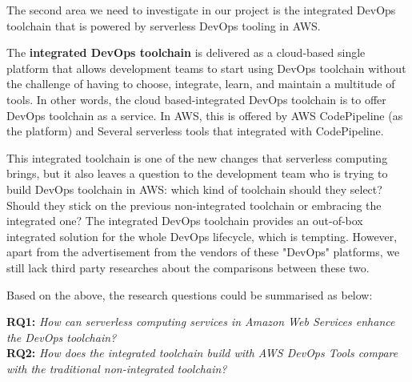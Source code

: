 \par
The second area we need to investigate in our project is the integrated DevOps toolchain that is powered by serverless DevOps tooling in AWS. 
\par
The \textbf{integrated DevOps toolchain} is delivered as a cloud-based single platform that allows development teams to start using DevOps toolchain without the challenge of having to choose, integrate, learn, and maintain a multitude of tools. In other words, the cloud based-integrated DevOps toolchain is to offer DevOps toolchain as a service.
In AWS, this is offered by AWS CodePipeline (as the platform) and Several serverless tools that integrated with CodePipeline.
\par
This integrated toolchain is one of the new changes that serverless computing brings, but it also leaves a question to the development team who is trying to build DevOps toolchain in AWS: which kind of toolchain should they select? Should they stick on the previous non-integrated toolchain or embracing the integrated one? The integrated DevOps toolchain provides an out-of-box integrated solution for the whole DevOps lifecycle, which is tempting. However, apart from the advertisement from the vendors of these "DevOps" platforms, we still lack third party researches about the comparisons between these two. 
\par
Based on the above, the research questions could be summarised as below: 
\par
\textbf{RQ1:} \textit{How can serverless computing services in Amazon Web Services enhance the DevOps toolchain?} \\
\textbf{RQ2:} \textit{How does the integrated toolchain build with AWS DevOps Tools compare with the traditional non-integrated toolchain?}
